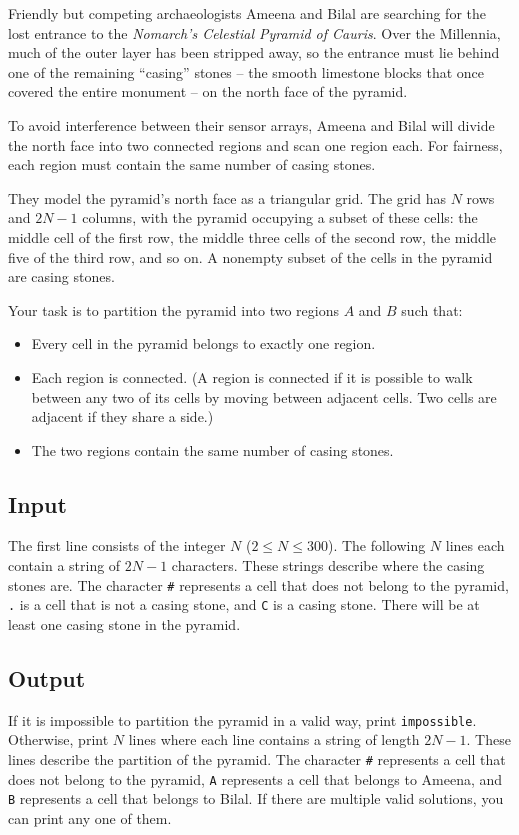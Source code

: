 

Friendly but competing archaeologists Ameena and Bilal are searching for the lost entrance to the \emph{Nomarch's Celestial Pyramid of Cauris}.
Over the Millennia, much of the outer layer has been stripped away, so the entrance must lie behind one of the remaining ``casing'' stones -- the smooth limestone blocks that once covered the entire monument -- on the north face of the pyramid.

To avoid interference between their sensor arrays, Ameena and Bilal will divide the north face into two connected regions and scan one region each. 
For fairness, each region must contain the same number of casing stones.

They model the pyramid's north face as a triangular grid.
The grid has $N$ rows and $2N - 1$ columns, with the pyramid occupying a subset of these cells: the middle cell of the first row, the middle three cells of the second row, the middle five of the third row, and so on. 
A nonempty subset of the cells in the pyramid are casing stones.

Your task is to partition the pyramid into two regions $A$ and $B$ such that:
\begin{itemize}
\item Every cell in the pyramid belongs to exactly one region.
\item Each region is connected.
  (A region is connected if it is possible to walk between any two of its cells by moving between adjacent cells.
    Two cells are adjacent if they share a side.)
\item The two regions contain the same number of casing stones.
\end{itemize}


\subsection*{Input}
The first line consists of the integer $N$ ($2 \leq N \leq 300$).
The following $N$ lines each contain a string of $2N - 1$ characters. These strings describe
where the casing stones are. The character \verb|#| represents a cell that does not belong to 
the pyramid, \verb|.| is a cell that is not a casing stone, and \verb|C| is a casing stone.
There will be at least one casing stone in the pyramid.


\subsection*{Output}
If it is impossible to partition the pyramid in a valid way, print \verb|impossible|.
Otherwise, print $N$ lines where each line contains a string of length $2N - 1$. These lines
describe the partition of the pyramid. The character \verb|#| represents a cell that does 
not belong to the pyramid, \verb|A| represents a cell that belongs to Ameena, and \verb|B|
represents a cell that belongs to Bilal. If there are multiple valid solutions, you can print 
any one of them.
